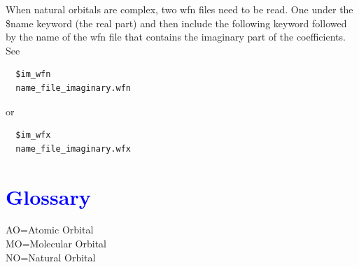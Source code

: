 \documentclass[10pt,a4paper]{article}
\newcommand{\tbl}[1]{{\textcolor{blue}{#1}}}
\begin{document}
When natural orbitals are complex, two wfn files need to be read. One under the \$name keyword (the real part) and then include the 
following keyword followed by the name of the wfn file that contains the imaginary part of the coefficients. See
\begin{verbatim}
  $im_wfn 
  name_file_imaginary.wfn
\end{verbatim}
or
\begin{verbatim}
  $im_wfx 
  name_file_imaginary.wfx
\end{verbatim}
\section*{\tbl{\textbf{Glossary}}}
AO=Atomic Orbital\\
MO=Molecular Orbital\\
NO=Natural Orbital
\end{document}
